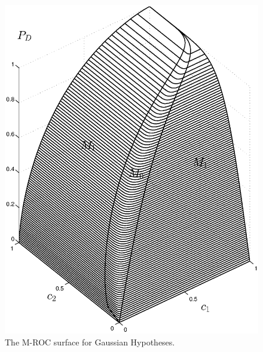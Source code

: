 \documentclass[12pt,journal,a4paper,twoside,onecolumn]{IEEEtran}
\begin{document}
\begin{spacing}{2.5}
\begin{figure}[!t]
\centering
\includegraphics[width=12cm]{ROC2.eps}
\caption{The M-ROC surface for Gaussian Hypotheses.}
\label{pic: LJS}
\end{figure}


\end{spacing}
\end{document}

